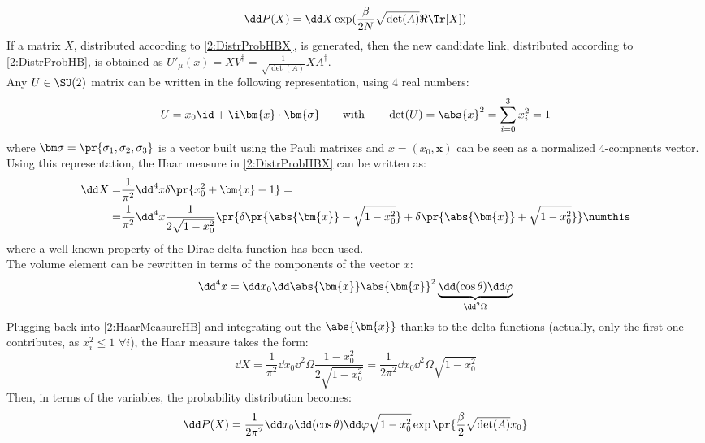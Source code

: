 \begin{equation}
    \dd P(X) = \dd X \exp(\frac\beta{2N}\sqrt{\det(A)}\Re\Tr[X]) \label{2:DistrProbHBX}
\end{equation}
If a matrix $X$, distributed according to \eqref{2:DistrProbHBX}, is generated, then the new candidate link, distributed according to \eqref{2:DistrProbHB}, is obtained as $U'_\mu(x) = XV^\dagger = \frac1{\sqrt{\det(A)}}XA^\dagger$.\\
Any $U\in\SU(2)$ matrix can be written in the following representation, using $4$ real numbers:
\begin{equation}
    U=x_0\id+\i \bm{x} \cdot \bm{\sigma} \qquad\text{with}\qquad \det(U)=\abs{x}^2=\sum_{i=0}^3x_i^2=1 \label{2:SU2Repr}
\end{equation}
where $\bm\sigma=\pr{\sigma_1,\sigma_2,\sigma_3}$ is a vector built using the Pauli matrixes and $x=(x_0,\bm{x})$ can be seen as a normalized $4$-compnents vector.
Using this representation, the Haar measure in \eqref{2:DistrProbHBX} can be written as:
\begin{align*}
    \dd X =& \frac1{\pi^2} \dd^4x \delta\pr{x_0^2+\bm{x}-1} =\\
    =& \frac1{\pi^2} \dd^4x \frac{1}{2\sqrt{1-x_0^2}} \pr{\delta\pr{\abs{\bm{x}}-\sqrt{1-x_0^2}}+\delta\pr{\abs{\bm{x}}+\sqrt{1-x_0^2}}} \numthis\label{2:HaarMeasureHB}
\end{align*}
where a well known property of the Dirac delta function has been used.\\
The volume element can be rewritten in terms of the components of the vector $x$:
\begin{equation}
    \dd^4x = \dd x_0\dd\abs{\bm{x}}\abs{\bm{x}}^2\underbrace{\dd(\cos\theta)\dd\varphi}_{\dd^2\Omega} \label{2:VolumeElemParam}
\end{equation}
Plugging back into \eqref{2:HaarMeasureHB} and integrating out the $\abs{\bm{x}}$ thanks to the delta functions (actually, only the first one contributes, as $x_i^2\leq1$ $\forall i$), the Haar measure takes the form:
\begin{equation}
    \dd X = \frac1{\pi^2}\dd x_0\dd^2\Omega\frac{1-x_0^2}{2\sqrt{1-x_0^2}} = \frac1{2\pi^2} \dd x_0 \dd^2\Omega \sqrt{1-x_0^2} \label{2:HaarMeasureHBSimplified}
\end{equation}
Then, in terms of the variables, the probability distribution becomes:
\begin{equation}
    \dd P(X) = \frac1{2\pi^2} \dd x_0 \dd(\cos\theta) \dd\varphi \sqrt{1-x_0^2} \exp\pr{\frac\beta2 \sqrt{\det(A)}x_0} \label{2:DistrProbHBXSimplified}
\end{equation}
